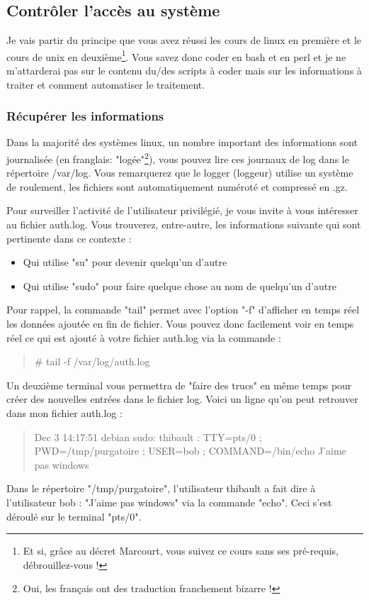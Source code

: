 \documentclass[a4paper,11pt]{article}
\newcommand{\commande}[1] {
    \begin{quote}
    \tt\raggedright #1 
    \end{quote}
}
\begin{document}
\subsection{Contrôler l'accès au système}
\par Je vais partir du principe que vous avez réussi les cours de linux en première et le cours de unix en deuxième\footnote{Et si, grâce au décret Marcourt, vous suivez ce cours sans ses pré-requis, débrouillez-vous !}. Vous savez donc coder en bash et en perl et je ne m'attarderai pas sur le contenu du/des scripts à coder mais sur les informations à traiter et comment automatiser le traitement.

\subsubsection{Récupérer les informations}
\par Dans la majorité des systèmes linux, un nombre important des informations sont journalisée (en franglais: "logée"\footnote{Oui, les français ont des traduction franchement bizarre !}), vous pouvez lire ces journaux de log dans le répertoire /var/log. Vous remarquerez que le logger (loggeur) utilise un système de roulement, les fichiers sont automatiquement numéroté et compressé en .gz.
\par Pour surveiller l'activité de l'utilisateur privilégié, je vous invite à vous intéresser au fichier auth.log. Vous trouverez, entre-autre, les informations suivante qui sont pertinente dans ce contexte :
\begin{itemize}
    \item Qui utilise "su" pour devenir quelqu'un d'autre
    \item Qui utilise "sudo" pour faire quelque chose au nom de quelqu'un d'autre
\end{itemize}
\par Pour rappel, la commande "tail" permet avec l'option "-f" d'afficher en temps réel les données ajoutée en fin de fichier. Vous pouvez donc facilement voir en temps réel ce qui est ajouté à votre fichier auth.log via la commande :
\commande{\# tail -f /var/log/auth.log}
\par Un deuxième terminal vous permettra de "faire des trucs" en même temps pour créer des nouvelles entrées dans le fichier log. Voici un ligne qu'on peut retrouver dans mon fichier auth.log :
\commande{Dec 3 14:17:51 debian sudo:  thibault : TTY=pts/0 ; PWD=/tmp/purgatoire ; USER=bob ; COMMAND=/bin/echo J'aime pas windows}
\par Dans le répertoire "/tmp/purgatoire", l'utilisateur thibault a fait dire à l'utilisateur bob : "J'aime pas windows" via la commande "echo". Ceci s'est déroulé sur le terminal "pts/0".
\end{document}
